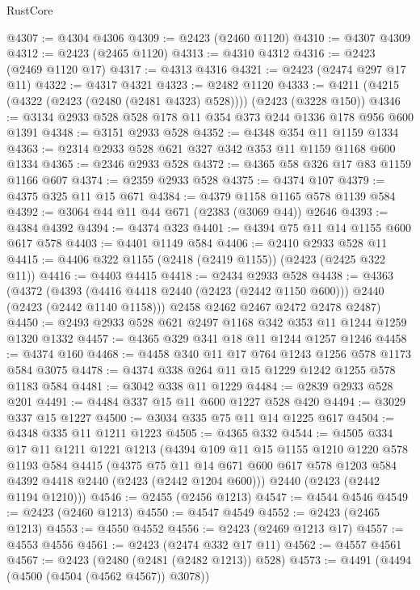 \begin{lexlean}{RustCore}
\begin{coremodule}
@4307 := @4304 @4306
@4309 := @2423 (@2460 @1120)
@4310 := @4307 @4309
@4312 := @2423 (@2465 @1120)
@4313 := @4310 @4312
@4316 := @2423 (@2469 @1120 @17)
@4317 := @4313 @4316
@4321 := @2423 (@2474 @297 @17 @11)
@4322 := @4317 @4321
@4323 := @2482 @1120
@4333 := @4211 (@4215 (@4322 (@2423 (@2480 (@2481 @4323) @528)))) (@2423 (@3228 @150))
@4346 := @3134 @2933 @528 @528 @178 @11 @354 @373 @244 @1336 @178 @956 @600 @1391
@4348 := @3151 @2933 @528
@4352 := @4348 @354 @11 @1159 @1334
@4363 := @2314 @2933 @528 @621 @327 @342 @353 @11 @1159 @1168 @600 @1334
@4365 := @2346 @2933 @528
@4372 := @4365 @58 @326 @17 @83 @1159 @1166 @607
@4374 := @2359 @2933 @528
@4375 := @4374 @107
@4379 := @4375 @325 @11 @15 @671
@4384 := @4379 @1158 @1165 @578 @1139 @584
@4392 := @3064 @44 @11 @44 @671 (@2383 (@3069 @44)) @2646
@4393 := @4384 @4392
@4394 := @4374 @323
@4401 := @4394 @75 @11 @14 @1155 @600 @617 @578
@4403 := @4401 @1149 @584
@4406 := @2410 @2933 @528 @11
@4415 := @4406 @322 @1155 (@2418 (@2419 @1155)) (@2423 (@2425 @322 @11))
@4416 := @4403 @4415
@4418 := @2434 @2933 @528
@4438 := @4363
    (@4372
      (@4393 (@4416 @4418 @2440 (@2423 (@2442 @1150 @600))) @2440 (@2423 (@2442 @1140 @1158)))
      @2458
      @2462
      @2467
      @2472
      @2478
      @2487)
@4450 := @2493 @2933 @528 @621 @2497 @1168 @342 @353 @11 @1244 @1259 @1320 @1332
@4457 := @4365 @329 @341 @18 @11 @1244 @1257 @1246
@4458 := @4374 @160
@4468 := @4458 @340 @11 @17 @764 @1243 @1256 @578 @1173 @584 @3075
@4478 := @4374 @338 @264 @11 @15 @1229 @1242 @1255 @578 @1183 @584
@4481 := @3042 @338 @11 @1229
@4484 := @2839 @2933 @528 @201
@4491 := @4484 @337 @15 @11 @600 @1227 @528 @420
@4494 := @3029 @337 @15 @1227
@4500 := @3034 @335 @75 @11 @14 @1225 @617
@4504 := @4348 @335 @11 @1211 @1223
@4505 := @4365 @332
@4544 := @4505
    @334
    @17
    @11
    @1211
    @1221
    @1213
    (@4394
      @109
      @11
      @15
      @1155
      @1210
      @1220
      @578
      @1193
      @584
      @4415
      (@4375
        @75
        @11
        @14
        @671
        @600
        @617
        @578
        @1203
        @584
        @4392
        @4418
        @2440
        (@2423 (@2442 @1204 @600)))
      @2440
      (@2423 (@2442 @1194 @1210)))
@4546 := @2455 (@2456 @1213)
@4547 := @4544 @4546
@4549 := @2423 (@2460 @1213)
@4550 := @4547 @4549
@4552 := @2423 (@2465 @1213)
@4553 := @4550 @4552
@4556 := @2423 (@2469 @1213 @17)
@4557 := @4553 @4556
@4561 := @2423 (@2474 @332 @17 @11)
@4562 := @4557 @4561
@4567 := @2423 (@2480 (@2481 (@2482 @1213)) @528)
@4573 := @4491 (@4494 (@4500 (@4504 (@4562 @4567)) @3078))

\end{coremodule}
\end{lexlean}
